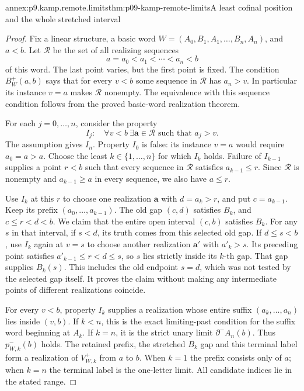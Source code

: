 \begin{annexitem}{annex:p9.kamp.remote.limits}{thm:p09-kamp-remote-limits}{A least cofinal position and the whole stretched interval}
\begin{proof}
Fix a linear structure, a basic word
\(W=(A_0,B_1,A_1,\ldots,B_n,A_n)\), and \(a<b\).
Let \(\mathcal R\) be the set of all realizing sequences
\[
                a=a_0<a_1<\cdots<a_n<b
\]
of this word. The last point varies, but the first point is fixed.
The condition \(B_W^+(a,b)\) says that for every \(v<b\)
some sequence in \(\mathcal R\) has \(a_n>v\).
In particular its instance \(v=a\) makes \(\mathcal R\)
nonempty. The equivalence with this sequence condition follows
from the proved basic-word realization theorem.

For each \(j=0,\ldots,n\), consider the property
\[
 I_j:\quad\forall v<b\ \exists\mathbf a\in\mathcal R
                                      \text{ such that }a_j>v.
\]
The assumption gives \(I_n\). Property \(I_0\) is false:
its instance \(v=a\) would require \(a_0=a>a\).
Choose the least \(k\in\{1,\ldots,n\}\) for which
\(I_k\) holds. Failure of \(I_{k-1}\) supplies a point
\(r<b\) such that every sequence in \(\mathcal R\)
satisfies \(a_{k-1}\leq r\). Since \(\mathcal R\)
is nonempty and \(a_{k-1}\geq a\) in every sequence,
we also have \(a\leq r\).

Use \(I_k\) at this \(r\) to choose one realization
\(\mathbf a\) with \(d=a_k>r\), and put \(c=a_{k-1}\).
Keep its prefix \((a_0,\ldots,a_{k-1})\).
The old gap \((c,d)\) satisfies \(B_k\), and \(c\leq r<d<b\).
We claim that the entire open interval \((c,b)\) satisfies \(B_k\).
For any \(s\) in that interval, if \(s<d\), its truth
comes from this selected old gap. If \(d\leq s<b\), use
\(I_k\) again at \(v=s\) to choose another realization
\(\mathbf a'\) with \(a'_k>s\). Its preceding point
satisfies \(a'_{k-1}\leq r<d\leq s\), so \(s\)
lies strictly inside its \(k\)-th gap. That gap supplies
\(B_k(s)\). This includes the old endpoint \(s=d\),
which was not tested by the selected gap itself. It proves the
claim without making any intermediate points of different
realizations coincide.

For every \(v<b\), property \(I_k\) supplies a realization
whose entire suffix \((a_k,\ldots,a_n)\) lies inside
\((v,b)\). If \(k<n\), this is the exact limiting-past
condition for the suffix word beginning at \(A_k\).
If \(k=n\), it is the strict unary limit
\(\partial^-A_n(b)\). Thus \(p_{W,k}^-(b)\) holds.
The retained prefix, the stretched \(B_k\) gap and this
terminal label form a realization of \(V_{W,k}^+\) from
\(a\) to \(b\). When \(k=1\) the prefix consists
only of \(a\); when \(k=n\) the terminal label is the
one-letter limit. All candidate indices lie in the stated range.


\end{proof}
\end{annexitem}
